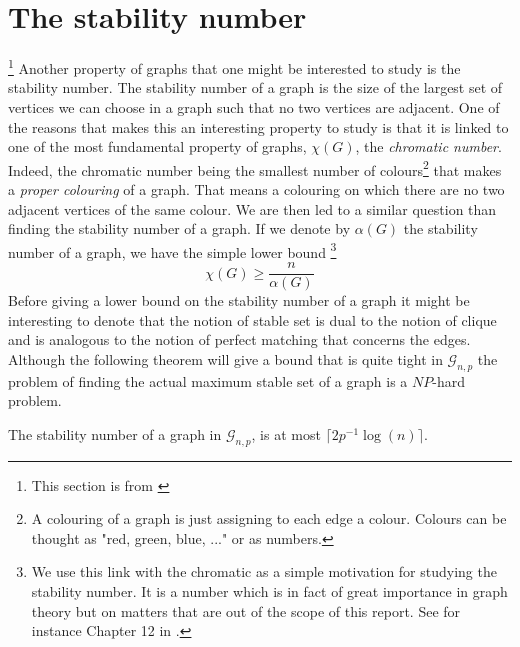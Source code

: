 \section{The stability number}\footnote{This section is from \cite{Bondy08}}
Another property of graphs that one might be interested to study is the stability number. The stability number of a graph is the size of the largest set of vertices we can choose in a graph such that no two vertices are adjacent. 
One of the reasons that makes this an interesting property to study is that it is linked to one of the most fundamental property of graphs, $\chi (G)$, the \emph{chromatic number}. Indeed, the chromatic number being the smallest number of colours\footnote{A colouring of a graph is just assigning to each edge a colour. Colours can be thought as "red, green, blue, ..." or as numbers.} that makes a \emph{proper colouring} of a graph. 
That means a colouring on which there are no two adjacent vertices of the same colour. 
We are then led to a similar question than finding the stability number of a graph.
If we denote by $\alpha(G)$ the stability number of a graph, we have the simple lower bound \footnote{ We use this link with the chromatic as a simple motivation for studying the stability number. It is a number which is in fact of great importance in graph theory but on matters that are out of the scope of this report. See for instance Chapter 12 in \cite{Bondy08}.}
\begin{equation}
	\chi(G) \geq \frac{n}{\alpha(G)}
\end{equation}
Before giving a lower bound on the stability number of a graph it might be interesting to denote that the notion of stable set is dual to the notion of clique and is analogous to the notion of perfect matching that concerns the edges.
Although the following theorem will give a bound that is quite tight in $\mathcal{G}_{n, p}$ the problem of finding the actual maximum stable set of a graph is a $NP$-hard problem.
\begin{theorem}
	The stability number of a graph in $\mathcal{G}_{n, p}$, is at most $\lceil 2p^{-1}\log(n)\rceil$.
\end{theorem}
